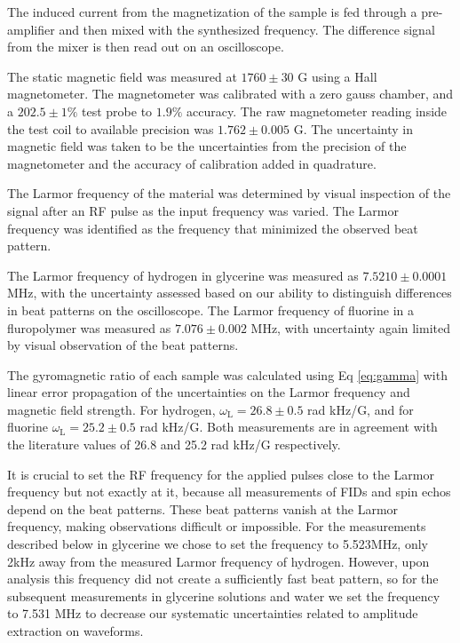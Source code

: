 The induced current from the magnetization of the sample is fed through a pre-amplifier and then mixed with the synthesized frequency. The difference signal from the mixer is then read out on an oscilloscope.

The static magnetic field was measured at $1760\pm30$ G using a Hall magnetometer. The magnetometer was calibrated with a zero gauss chamber, and a $202.5 \pm 1\%$ test probe to $1.9\%$ accuracy. The raw magnetometer reading inside the test coil to available precision was $1.762\pm0.005$ G. The uncertainty in magnetic field was taken to be the uncertainties from the precision of the magnetometer and the accuracy of calibration added in quadrature.

The Larmor frequency of the material was determined by visual inspection of the signal after an RF pulse as the input frequency was varied. The Larmor frequency was identified as the frequency that minimized the observed beat pattern. 

The Larmor frequency of hydrogen in glycerine was measured as $7.5210\pm0.0001$ MHz, with the uncertainty assessed based on our ability to distinguish differences in beat patterns on the oscilloscope. The Larmor frequency of fluorine in a fluropolymer was measured as $7.076\pm0.002$ MHz, with uncertainty again limited by visual observation of the beat patterns.

The gyromagnetic ratio of each sample was calculated using Eq \ref{eq:gamma} with linear error propagation of the uncertainties
on the Larmor frequency and magnetic field strength. For hydrogen, $\omega_{\mathrm{L}}=26.8\pm0.5$ rad kHz/G, and for fluorine $\omega_{\mathrm{L}}=25.2\pm0.5$ rad kHz/G. Both measurements are in agreement with the literature values of 26.8 and 25.2 rad kHz/G respectively\cite{crc}.

It is crucial to set the RF frequency for the applied pulses close to the Larmor frequency but not exactly at it, because all measurements of FIDs and spin echos depend on the beat patterns. These beat patterns vanish at the Larmor frequency, making observations difficult or impossible. For the measurements described below in glycerine we chose to set the frequency to 5.523MHz, only 2kHz away from the measured Larmor frequency of hydrogen. However, upon analysis this frequency did not create a sufficiently fast beat pattern, so for the subsequent measurements in glycerine solutions and water we set the frequency to 7.531 MHz to decrease our systematic uncertainties related to amplitude extraction on waveforms.

